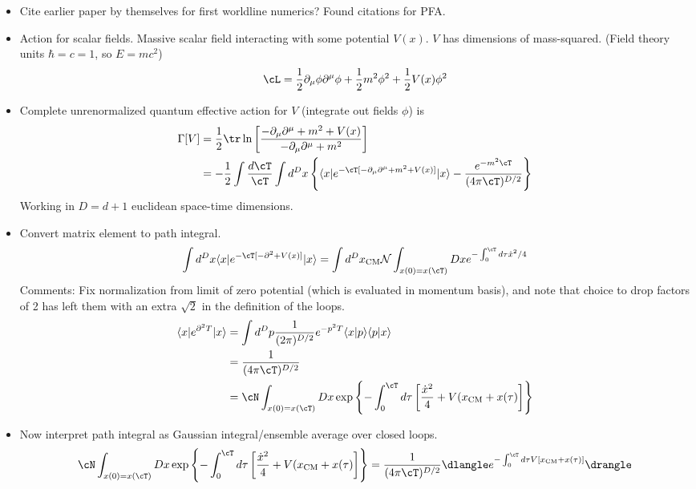 \begin{itemize}
\item Cite earlier paper by themselves for first worldline numerics?   Found citations for PFA.
\item Action for scalar fields.   Massive scalar field interacting with some potential $V(x)$.
  $V$ has dimensions of mass-squared.  (Field theory units $\hbar=c=1$, so $E=mc^2$)
\begin{equation}
\cL = \frac{1}{2}\partial_\mu\phi\partial^\mu\phi +\frac{1}{2}m^2\phi^2+\frac{1}{2}V(x)\phi^2
\end{equation}
\item Complete unrenormalized quantum effective action for $V$ (integrate out fields $\phi$) is 
\begin{align}
  \Gamma[V] &=\frac{1}{2}\tr\ln \left[ \frac{-\partial_\mu\partial^\mu +m^2 + V(x)}
    {-\partial_\mu\partial^\mu +m^2}\right]\\
&   =-\frac{1}{2}\int \frac{d\cT}{\cT} \int d^D x \left\{ 
\langle x|e^{-\cT[-\partial_\mu\partial^\mu +m^2 + V(x)]}|x\rangle -\frac{e^{-m^2 \cT}}{(4\pi \cT)^{D/2}}\right\}
\end{align}
Working in $D=d+1$ euclidean space-time dimensions.  
\item Convert matrix element to path integral.  
\begin{equation}
  \int d^D x \langle x|e^{-\cT[-\partial^2+V(x)]}|x\rangle = \int d^D x_{\text{CM}} \mathcal{N}\int_{x(0)=x(\cT)}Dx e^{-\int_0^\cT d\tau \dot{x}^2/4}
\end{equation}
Comments: Fix normalization from limit of zero potential (which is evaluated in momentum basis), and note that choice to drop factors of 2 has left them with an extra $\sqrt{2}$ in the definition  of the loops.
\begin{align}
\langle x| e^{\partial^2T}|x\rangle &= \int d^Dp\frac{1}{(2\pi)^{D/2}} e^{-p^2T}\langle x|p\rangle\langle p|x\rangle\\
&= \frac{1}{(4\pi \cT)^{D/2}}\\
&=\cN \int_{x(0)=x(\cT)}Dx \exp\left\{-\int_0^\cT d\tau \left[\frac{\dot{x}^2}{4}+V(x_{\text{CM}}+x(\tau)\right]\right\}
\end{align}
\item Now interpret path integral as Gaussian integral/ensemble average over closed loops.  
\begin{equation}
\cN \int_{x(0)=x(\cT)}Dx \exp\left\{-\int_0^\cT d\tau \left[\frac{\dot{x}^2}{4}+V(x_{\text{CM}}+x(\tau)\right]\right\} = \frac{1}{(4\pi \cT)^{D/2}}\dlangle e^{-\int_0^\cT d\tau V[x_{\text{CM}}+x(\tau)]}\drangle

\end{equation}
\end{itemize}
